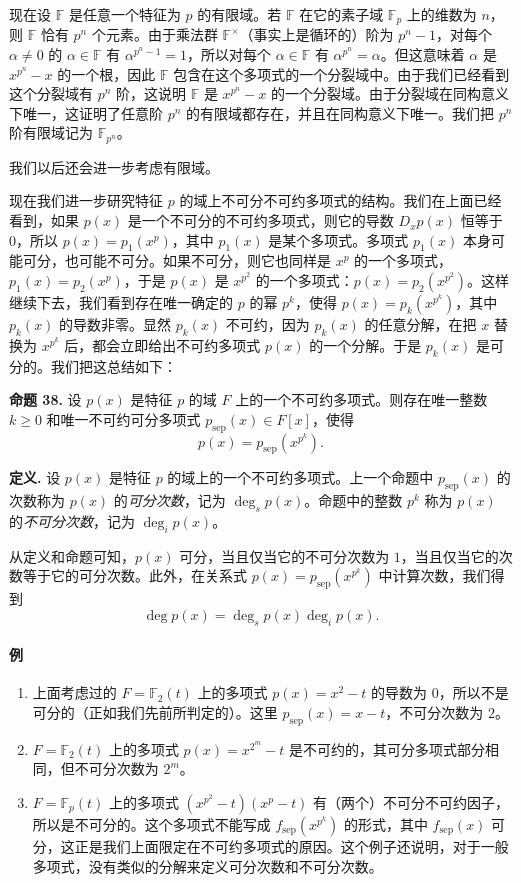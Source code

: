 现在设 $\mathbb F$ 是任意一个特征为 $p$ 的有限域。若 $\mathbb F$ 在它的素子域 $\mathbb F_p$ 上的维数为 $n$，则 $\mathbb F$ 恰有 $p^n$ 个元素。由于乘法群 $\mathbb F^\times$（事实上是循环的）阶为 $p^n-1$，对每个 $\alpha\neq0$ 的 $\alpha\in\mathbb F$ 有 $\alpha^{p^n-1}=1$，所以对每个 $\alpha\in\mathbb F$ 有 $\alpha^{p^n}=\alpha$。但这意味着 $\alpha$ 是 $x^{p^n}-x$ 的一个根，因此 $\mathbb F$ 包含在这个多项式的一个分裂域中。由于我们已经看到这个分裂域有 $p^n$ 阶，这说明 $\mathbb F$ 是 $x^{p^n}-x$ 的一个分裂域。由于分裂域在同构意义下唯一，这证明了任意阶 $p^n$ 的有限域都存在，并且在同构意义下唯一。我们把 $p^n$ 阶有限域记为 $\mathbb F_{p^n}$。

我们以后还会进一步考虑有限域。

现在我们进一步研究特征 $p$ 的域上不可分不可约多项式的结构。我们在上面已经看到，如果 $p(x)$ 是一个不可分的不可约多项式，则它的导数 $D_xp(x)$ 恒等于 $0$，所以 $p(x)=p_1(x^p)$，其中 $p_1(x)$ 是某个多项式。多项式 $p_1(x)$ 本身可能可分，也可能不可分。如果不可分，则它也同样是 $x^p$ 的一个多项式，$p_1(x)=p_2(x^p)$，于是 $p(x)$ 是 $x^{p^2}$ 的一个多项式：$p(x)=p_2(x^{p^2})$。这样继续下去，我们看到存在唯一确定的 $p$ 的幂 $p^k$，使得 $p(x)=p_k(x^{p^k})$，其中 $p_k(x)$ 的导数非零。显然 $p_k(x)$ 不可约，因为 $p_k(x)$ 的任意分解，在把 $x$ 替换为 $x^{p^k}$ 后，都会立即给出不可约多项式 $p(x)$ 的一个分解。于是 $p_k(x)$ 是可分的。我们把这总结如下：

\noindent\textbf{命题 38.} 设 $p(x)$ 是特征 $p$ 的域 $F$ 上的一个不可约多项式。则存在唯一整数 $k\geq0$ 和唯一不可约可分多项式 $p_{\mathrm{sep}}(x)\in F[x]$，使得
\[
p(x)=p_{\mathrm{sep}}(x^{p^k}).
\]

\noindent\textbf{定义.} 设 $p(x)$ 是特征 $p$ 的域上的一个不可约多项式。上一个命题中 $p_{\mathrm{sep}}(x)$ 的次数称为 $p(x)$ 的\emph{可分次数}，记为 $\deg_s p(x)$。命题中的整数 $p^k$ 称为 $p(x)$ 的\emph{不可分次数}，记为 $\deg_i p(x)$。

从定义和命题可知，$p(x)$ 可分，当且仅当它的不可分次数为 $1$，当且仅当它的次数等于它的可分次数。此外，在关系式 $p(x)=p_{\mathrm{sep}}(x^{p^k})$ 中计算次数，我们得到
\[
\deg p(x)=\deg_s p(x)\deg_i p(x).
\]

\paragraph{例}
\begin{enumerate}[label=(\arabic*)]
	\item 上面考虑过的 $F=\mathbb F_2(t)$ 上的多项式 $p(x)=x^2-t$ 的导数为 $0$，所以不是可分的（正如我们先前所判定的）。这里 $p_{\mathrm{sep}}(x)=x-t$，不可分次数为 $2$。
	
	\item $F=\mathbb F_2(t)$ 上的多项式 $p(x)=x^{2^m}-t$ 是不可约的，其可分多项式部分相同，但不可分次数为 $2^m$。
	
	\item $F=\mathbb F_p(t)$ 上的多项式 $(x^{p^2}-t)(x^p-t)$ 有（两个）不可分不可约因子，所以是不可分的。这个多项式不能写成 $f_{\mathrm{sep}}(x^{p^k})$ 的形式，其中 $f_{\mathrm{sep}}(x)$ 可分，这正是我们上面限定在不可约多项式的原因。这个例子还说明，对于一般多项式，没有类似的分解来定义可分次数和不可分次数。
\end{enumerate}

